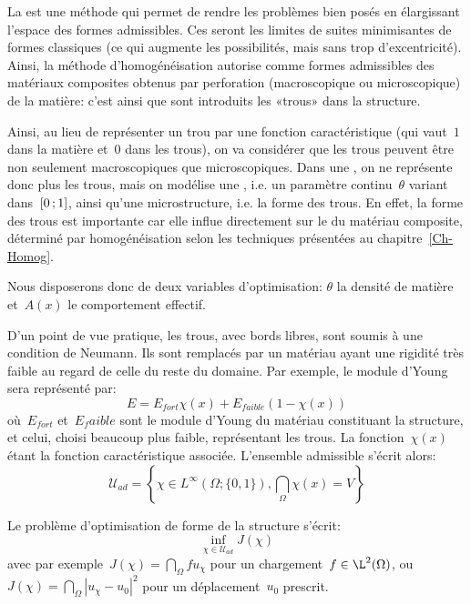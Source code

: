 \medskip
La  est une méthode qui permet de rendre les problèmes bien posés en élargissant l'espace des formes admissibles.
Ces  seront les limites de suites minimisantes de formes classiques (ce qui augmente les possibilités, mais sans trop d'excentricité).
Ainsi, la méthode d'homogénéisation autorise comme formes admissibles des matériaux composites obtenus par perforation (macroscopique ou microscopique) de la matière: c'est ainsi que sont introduits les «trous» dans la structure.

\medskip
Ainsi, au lieu de représenter un trou par une fonction caractéristique (qui vaut~$1$ dans la matière et~$0$ dans les trous), on va considérer que les trous peuvent être non seulement macroscopiques que microscopiques. Dans une , on ne représente donc plus les trous, mais on modélise une , i.e. un paramètre continu~$\theta$ variant dans~$\mathopen{[}0\,;1\mathclose{]}$, ainsi qu'une microstructure, i.e. la forme des trous.
En effet, la forme des trous est importante car elle influe directement sur le  du matériau composite, déterminé par homogénéisation selon les techniques présentées au chapitre~\ref{Ch-Homog}.

Nous disposerons donc de deux variables d'optimisation: $\theta$ la densité de matière et~$A(x)$ le comportement effectif.

\medskip
D'un point de vue pratique, les trous, avec bords libres, sont soumis à une condition de Neumann. Ils sont remplacés par un matériau ayant une rigidité très faible au regard de celle du reste du domaine.
Par exemple, le module d'Young sera représenté par: 
\begin{equation}\label{Eq-EcvOpt}
E = E_{fort} \chi(x) + E_{faible}(1-\chi(x))
\end{equation}
où~$E_{fort}$ et~${E_faible}$ sont le module d'Young du matériau constituant la structure, et celui, choisi beaucoup plus faible, représentant les trous. La fonction~$\chi(x)$ étant la fonction caractéristique associée.
L'ensemble admissible s'écrit alors:
\begin{equation}
\mathcal{U}_{ad}=\left\{ \chi\in L^\infty(\Omega;\{0,1\}),
\dint_\Omega \chi(x) = V \right\}
\end{equation}

Le problème d'optimisation de forme de la structure s'écrit:
\begin{equation}
\inf_{\chi\in\mathcal{U}_{ad}} J(\chi)
\end{equation}
avec par exemple~$J(\chi)=\dint_\Omega fu_\chi$ pour un chargement~$f\in\L^2(\Omega)$, ou~$J(\chi)=\dint_\Omega|u_\chi-u_0|^2$ pour un déplacement~$u_0$ prescrit.

